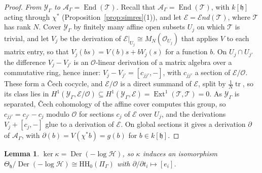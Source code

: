 \documentclass[11pt]{amsart}
\numberwithin{table}{section}
\numberwithin{figure}{section}
\numberwithin{equation}{section}
\newtheorem{lem}[thm]{Lemma}
\theoremstyle{definition}
\theoremstyle{plain}
\newcommand{\cA}{\mathcal{A}}
\newcommand{\cO}{\mathcal{O}}
\newcommand{\cY}{\mathcal{Y}}
\newcommand{\h}{\mathfrak{h}}
\newcommand{\HH}{\mathrm{HH}}
\DeclareMathOperator{\End}{End}
\DeclareMathOperator{\Ext}{Ext}
\DeclareMathOperator{\Der}{Der}
\newcommand{\sEnd}{\mathscr{E}\!nd}
\begin{document}
\begin{proof}
\emph{From $\cY_\Gamma$ to $\cA_\Gamma = \End(\mathcal T)$.} Recall that $\cA_\Gamma = \End(\mathcal T)$, with $k[\h]$ acting through $\chi^*$ (Proposition~\ref{prop:simres}(1)), and let $\mathcal E = \sEnd(\mathcal T)$, where $\mathcal T$ has rank $N$. Cover $\cY_\Gamma$ by finitely many affine open subsets $U_j$ on which $\mathcal T$ is trivial, and let $V_j$ be the derivation of $\mathcal E|_{U_j} \cong M_N(\cO_{U_j})$ that applies $V$ to each matrix entry, so that $V_j(bs) = V(b)s + bV_j(s)$ for a function $b$. On $U_j \cap U_{j'}$ the difference $V_j - V_{j'}$ is an $\cO$-linear derivation of a matrix algebra over a commutative ring, hence inner: $V_j - V_{j'} = [c_{jj'}, -]$, with $c_{jj'}$ a section of $\mathcal E/\cO$. These form a \v{C}ech cocycle, and $\mathcal E/\cO$ is a direct summand of $\mathcal E$, split by $\frac1N\operatorname{tr}$, so its class lies in $H^1(\cY_\Gamma, \mathcal E/\cO) \subseteq H^1(\cY_\Gamma, \mathcal E) = \Ext^1(\mathcal T, \mathcal T) = 0$. As $\cY_\Gamma$ is separated, \v{C}ech cohomology of the affine cover computes this group, so $c_{jj'} = c_{j'} - c_j$ modulo $\cO$ for sections $c_j$ of $\mathcal E$ over $U_j$, and the derivations $V_j + [c_j, -]$ glue to a derivation of $\mathcal E$. On global sections it gives a derivation $\partial$ of $\cA_\Gamma$, with $\partial(b) = V(\chi^*b) = g(b)$ for $b \in k[\h]$.
\end{proof}

\begin{lem}\label{lem:KS}
$\ker\kappa = \Der(-\log\mathcal H)$, so $\kappa$ induces an isomorphism $\Theta_\h/\Der(-\log\mathcal H) \cong \HH_0(\Pi_\Gamma)$ with $\partial/\partial t_i \mapsto [e_i]$.
\end{lem}
\end{document}
